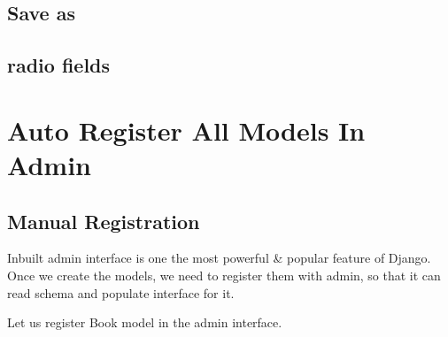 \documentclass[letterpaper,12pt,english]{sphinxmanual}
\begin{document}
\section{Save as}
\label{\detokenize{admin_better_defaults:save-as}}

\section{radio fields}
\label{\detokenize{admin_better_defaults:radio-fields}}

\chapter{Auto Register All Models In Admin}
\label{\detokenize{admin_auto_register_models:auto-register-all-models-in-admin}}\label{\detokenize{admin_auto_register_models::doc}}

\section{Manual Registration}
\label{\detokenize{admin_auto_register_models:manual-registration}}
Inbuilt admin interface is one the most powerful \& popular feature of Django. Once we create the models, we need to register them with admin, so that it can read schema and populate interface for it.

Let us register Book model in the admin interface.

\begin{sphinxVerbatim}[commandchars=\\\{\}]

   

   


 
        


 
\end{sphinxVerbatim}
\end{document}
